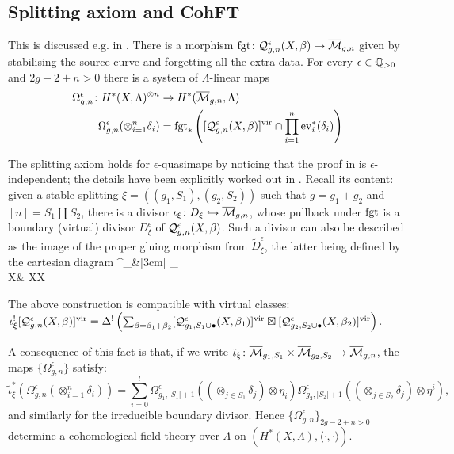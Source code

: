 \subsection{Splitting axiom and CohFT}\label{sec:cohFT}
This is discussed e.g. in \cite[\S 2.3.3]{CF-K-higher-genus}. There is a morphism $\operatorname{fgt}\colon \mathcal{Q}^{\epsilon}_{g,n}(X,\beta)\rightarrow \overline{\mathcal{M}}_{g,n}$ given by stabilising the source curve and forgetting all the extra data. For every $\epsilon\in\mathbb{Q}_{>0}$ and $2g-2+n>0$ there is a system of $\Lambda$-linear maps
\begin{align*}\Omega^\epsilon_{g,n}\colon H^*(X,\Lambda)^{\otimes n} & \rightarrow H^*(\overline{\mathcal{M}}_{g,n},\Lambda) \\
\Omega^\epsilon_{g,n}(\otimes_{i=1}^n\delta_i) & = \operatorname{fgt}_*\left([\mathcal{Q}^{\epsilon}_{g,n}(X,\beta)]^{\mathrm{vir}}\cap\prod_{i=1}^n\operatorname{ev}_i^*(\delta_i)\right) \end{align*}

The splitting axiom holds for $\epsilon$-quasimaps by noticing that the proof in \cite{Behrend} is $\epsilon$-independent; the details have been explicitly worked out in \cite[Appendix B.3]{BN}. Recall its content: given a stable splitting $\xi=((g_1,S_1),(g_2,S_2))$ such that $g=g_1+g_2$ and $[n]=S_1\coprod S_2$, there is a divisor $\iota_\xi\colon D_\xi\hookrightarrow\overline{\mathcal{M}}_{g,n}$, whose pullback under $\operatorname{fgt}$ is a boundary (virtual) divisor $D^\epsilon_\xi$ of $\mathcal{Q}^{\epsilon}_{g,n}(X,\beta)$. Such a divisor can also be described as the image of the proper gluing morphism from $\tilde{D}^\epsilon_\xi$, the latter being defined by the cartesian diagram
\bcd
{}^\epsilon_\xi \ar[d]\ar[r] &[3cm] \coprod_{}\times {} \\
X & X\times X
\ecd

\begin{lem} The above construction is compatible with virtual classes:
 $\iota_\xi^![\mathcal{Q}^{\epsilon}_{g,n}(X,\beta)]^{\mathrm{vir}}=\Delta^!\left(\sum_{\beta=\beta_1+\beta_2}[\mathcal{Q}^{\epsilon}_{g_1,S_1\cup\bullet}(X,\beta_1)]^{\mathrm{vir}}\boxtimes[\mathcal{Q}^{\epsilon}_{g_2,S_2\cup\bullet}(X,\beta_2)]^{\mathrm{vir}}\right).$
\end{lem}

A consequence of this fact is that, if we write $\tilde{\iota}_\xi\colon \overline{\mathcal{M}}_{g_1,S_1}\times \overline{\mathcal{M}}_{g_2,S_2}\rightarrow \overline{\mathcal{M}}_{g,n}$, the maps $\{\Omega^\epsilon_{g,n}\}$ satisfy:
\[\tilde{\iota}_\xi^*(\Omega^\epsilon_{g,n}(\otimes_{i=1}^n\delta_i))=\sum_{i=0}^l\Omega^\epsilon_{g_1,\lvert S_1\rvert+1}((\otimes_{j\in S_1}\delta_j)\otimes \eta_i)\Omega^\epsilon_{g_2,\lvert S_2\rvert+1}((\otimes_{j\in S_2}\delta_j)\otimes \eta^i),\]
and similarly for the irreducible boundary divisor. Hence $\{\Omega^\epsilon_{g,n}\}_{2g-2+n>0}$ determine a cohomological field theory over $\Lambda$ on $(H^*(X,\Lambda),\langle\cdot,\cdot\rangle)$.

